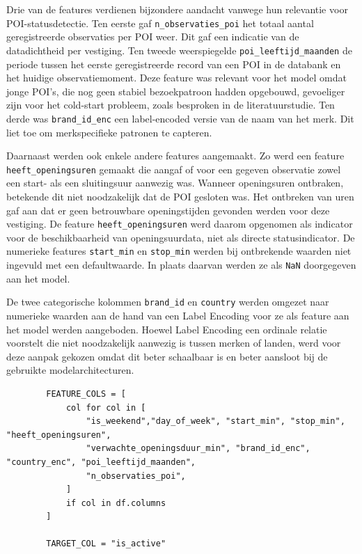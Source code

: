 Drie van de features verdienen bijzondere aandacht vanwege hun relevantie voor POI-statusdetectie. Ten eerste gaf \texttt{n\_observaties\_poi} het totaal aantal geregistreerde observaties per POI weer. Dit gaf een indicatie van de datadichtheid per vestiging. Ten tweede weerspiegelde \texttt{poi\_leeftijd\_maanden} de periode tussen het eerste geregistreerde record van een POI in de databank en het huidige observatiemoment. Deze feature was relevant voor het model omdat jonge POI's, die nog geen stabiel bezoekpatroon hadden opgebouwd, gevoeliger zijn voor het cold-start probleem, zoals besproken in de literatuurstudie. Ten derde was \texttt{brand\_id\_enc} een label-encoded versie van de naam van het merk. Dit liet toe om merkspecifieke patronen te capteren.

Daarnaast werden ook enkele andere features aangemaakt. Zo werd een feature \texttt{heeft\_openingsuren} gemaakt die aangaf of voor een gegeven observatie zowel een start- als een sluitingsuur aanwezig was. Wanneer openingsuren ontbraken, betekende dit niet noodzakelijk dat de POI gesloten was. Het ontbreken van uren gaf aan dat er geen betrouwbare openingstijden gevonden werden voor deze vestiging. De feature \texttt{heeft\_openingsuren} werd daarom opgenomen als indicator voor de beschikbaarheid van openingsuurdata, niet als directe statusindicator. De numerieke features \texttt{start\_min} en \texttt{stop\_min} werden bij ontbrekende waarden niet ingevuld met een defaultwaarde. In plaats daarvan werden ze als \texttt{NaN} doorgegeven aan het model.

De twee categorische kolommen \texttt{brand\_id} en \texttt{country} werden omgezet naar numerieke waarden aan de hand van een Label Encoding voor ze als feature aan het model werden aangeboden. Hoewel Label Encoding een ordinale relatie voorstelt die niet noodzakelijk aanwezig is tussen merken of landen, werd voor deze aanpak gekozen omdat dit beter schaalbaar is en beter aansloot bij de gebruikte modelarchitecturen.

\begin{listing}[H]
    \begin{verbatim}
        FEATURE_COLS = [
            col for col in [
                "is_weekend","day_of_week", "start_min", "stop_min", "heeft_openingsuren",
                "verwachte_openingsduur_min", "brand_id_enc", "country_enc", "poi_leeftijd_maanden",
                "n_observaties_poi",
            ]
            if col in df.columns
        ]
        
        TARGET_COL = "is_active"
    \end{verbatim}
    \caption[Feature selectie]{Definitie van de finale feature set en de doelvariabele.}
\end{listing}

